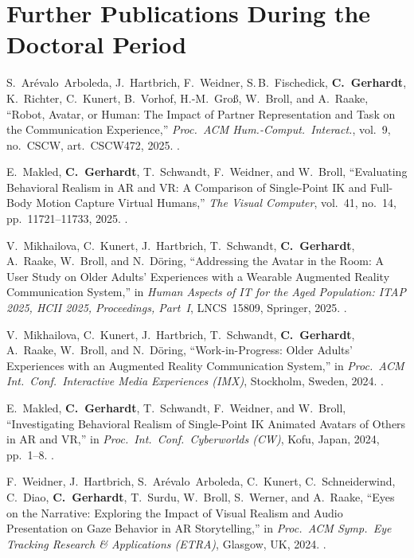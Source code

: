 \section*{Further Publications During the Doctoral Period}

\begin{enumerate}[label={[\arabic*]}, leftmargin=2em, resume]

\item S.~Ar{\'e}valo~Arboleda, J.~Hartbrich, F.~Weidner, S.\,B.~Fischedick, \textbf{C.~Gerhardt}, K.~Richter, C.~Kunert, B.~Vorhof, H.-M.~Gro{\ss}, W.~Broll, and A.~Raake,
``Robot, Avatar, or Human: The Impact of Partner Representation and Task on the Communication Experience,''
\emph{Proc.\ ACM Hum.-Comput.\ Interact.}, vol.~9, no.~CSCW, art.~CSCW472, 2025.
.

\item E.~Makled, \textbf{C.~Gerhardt}, T.~Schwandt, F.~Weidner, and W.~Broll,
``Evaluating Behavioral Realism in AR and VR: A Comparison of Single-Point IK and Full-Body Motion Capture Virtual Humans,''
\emph{The Visual Computer}, vol.~41, no.~14, pp.~11721--11733, 2025.
.

\item V.~Mikhailova, C.~Kunert, J.~Hartbrich, T.~Schwandt, \textbf{C.~Gerhardt}, A.~Raake, W.~Broll, and N.~D{\"o}ring,
``Addressing the Avatar in the Room: A User Study on Older Adults' Experiences with a Wearable Augmented Reality Communication System,''
in \emph{Human Aspects of IT for the Aged Population: ITAP 2025, HCII 2025, Proceedings, Part~I},
LNCS~15809, Springer, 2025.
.

\item V.~Mikhailova, C.~Kunert, J.~Hartbrich, T.~Schwandt, \textbf{C.~Gerhardt}, A.~Raake, W.~Broll, and N.~D{\"o}ring,
``Work-in-Progress: Older Adults' Experiences with an Augmented Reality Communication System,''
in \emph{Proc.\ ACM Int.\ Conf.\ Interactive Media Experiences (IMX)},
Stockholm, Sweden, 2024.
.

\item E.~Makled, \textbf{C.~Gerhardt}, T.~Schwandt, F.~Weidner, and W.~Broll,
``Investigating Behavioral Realism of Single-Point IK Animated Avatars of Others in AR and VR,''
in \emph{Proc.\ Int.\ Conf.\ Cyberworlds (CW)},
Kofu, Japan, 2024, pp.~1--8.
.

\item F.~Weidner, J.~Hartbrich, S.~Ar{\'e}valo~Arboleda, C.~Kunert, C.~Schneiderwind, C.~Diao, \textbf{C.~Gerhardt}, T.~Surdu, W.~Broll, S.~Werner, and A.~Raake,
``Eyes on the Narrative: Exploring the Impact of Visual Realism and Audio Presentation on Gaze Behavior in AR Storytelling,''
in \emph{Proc.\ ACM Symp.\ Eye Tracking Research \& Applications (ETRA)},
Glasgow, UK, 2024.
.


\end{enumerate}
